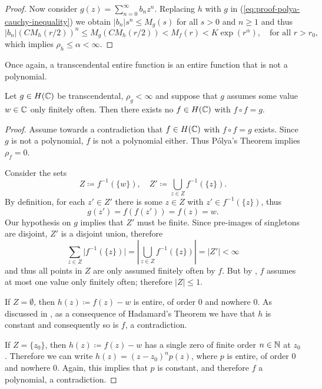 \begin{proof}
    Now consider $g(z) = \sum_{n=0}^\infty b_n z^n$. Replacing $h$ with $g$ in (\ref{eq:proof-polya-cauchy-inequality}) we obtain $\vert b_n \vert s^n \leq M_g(s)$ for all $s > 0$ and $n \geq 1$ and thus
    \begin{equation*}
        \vert b_n \vert (C M_h(r/2))^n \leq M_g(C M_h(r/2)) < M_f(r) < K \exp(r^\alpha), \quad \textrm{for all } r > r_0,
    \end{equation*}
    which implies $\rho_h \leq \alpha < \infty$.
\end{proof}

Once again, a transcendental entire function is an entire function that is not a polynomial.

\begin{theorem}[Thron] \label{thm:thron}
    Let $g \in H(\mathbb{C})$ be transcendental, $\rho_g < \infty$ and suppose that $g$ assumes some value $w \in \mathbb{C}$ only finitely often. Then there exists no $f \in H(\mathbb{C})$ with $f \circ f = g$.
\end{theorem}

\begin{proof}
    Assume towards a contradiction that $f \in H(\mathbb{C})$ with $f \circ f = g$ exists. Since $g$ is not a polynomial, $f$ is not a polynomial either. Thus Pólya's Theorem implies $\rho_f = 0$.
    
    Consider the sets
    $$ Z \coloneqq f^{-1}(\{ w \}), \quad Z' \coloneqq \bigcup_{z \in Z} f^{-1}(\{ z \}). $$
    By definition, for each $z' \in Z'$ there is some $z \in Z$ with $z' \in f^{-1}(\{ z \})$, thus
    $$ g(z') = f(f(z')) = f(z) = w. $$
    Our hypothesis on $g$ implies that $Z'$ must be finite. Since pre-images of singletons are disjoint, $Z'$ is a disjoint union, therefore
    $$ \sum_{z \in Z} \vert f^{-1}(\{ z \}) \vert = \left\vert \bigcup_{z \in Z} f^{-1}(\{ z \}) \right\vert = \vert Z' \vert < \infty $$
    and thus all points in $Z$ are only assumed finitely often by $f$. But by , $f$ assumes at most one value only finitely often; therefore $\vert Z \vert \leq 1$.

    If $Z = \emptyset$, then $h(z) \coloneqq f(z) - w$ is entire, of order $0$ and nowhere $0$. As discussed in , as a consequence of Hadamard's Theorem we have that $h$ is constant and consequently so is $f$, a contradiction.

    If $Z = \{ z_0 \}$, then $h(z) \coloneqq f(z) - w$ has a single zero of finite order $n \in \mathbb{N}$ at $z_0$. Therefore we can write $h(z) = (z - z_0)^n p(z)$, where $p$ is entire, of order $0$ and nowhere $0$. Again, this implies that $p$ is constant, and therefore $f$ a polynomial, a contradiction.
\end{proof}

